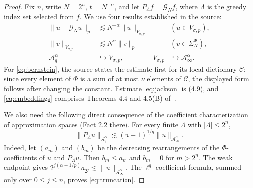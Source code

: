 \documentclass[10pt]{article}
\newcommand{\A}{\mathcal A}
\newcommand{\G}{\mathscr G}
\newcommand{\V}{V_{\sigma,p}}
\newcommand{\norm}[1]{\lVert #1\rVert}
\begin{document}
\begin{proof}
Fix $n$, write $N=2^n$, $t=N^{-\alpha}$, and let
$P_\Lambda f=\G_Nf$, where $\Lambda$ is the greedy index set selected from
$f$.  We use four results established in the source:
\begin{align}
 \norm{u-\G_Nu}_p&\lesssim N^{-\alpha}\norm u_{\V}
       &&(u\in\V),                                      \label{eq:jackson}\tag{J}\\
 \norm v_{\V}&\lesssim N^\alpha\norm v_p
       &&(v\in\Sigma_N^\Phi),                           \label{eq:bernstein}\tag{B}\\
 \A_q^\alpha&\hookrightarrow\V,
       &\V&\hookrightarrow\A_\infty^\alpha.            \label{eq:embeddings}\tag{E}
\end{align}
For \eqref{eq:bernstein}, the source states the estimate first for its local
dictionary $\mathscr C$; since every element of $\Phi$ is a sum of at most
$\nu$ elements of $\mathscr C$, the displayed form follows after changing
the constant.  Estimate \eqref{eq:jackson} is (4.9), and
\eqref{eq:embeddings} comprises Theorems 4.4 and 4.5(B) of~\cite{GKP}.

We also need the following direct consequence of the coefficient
characterization of approximation spaces (Fact 2.2 there).  For every finite
$\Lambda$ with $|\Lambda|\le2^n$,
\begin{equation}\label{eq:truncation}
 \norm{P_\Lambda u}_{\A_q^\alpha}
 \lesssim (n+1)^{1/q}\norm u_{\A_\infty^\alpha}.
\end{equation}
Indeed, let $(a_m)$ and $(b_m)$ be the decreasing rearrangements of the
$\Phi$-coefficients of $u$ and $P_\Lambda u$.  Then $b_m\le a_m$ and
$b_m=0$ for $m>2^n$.  The weak endpoint gives
$2^{j(\alpha+1/p)}a_{2^j}\lesssim\norm u_{\A_\infty^\alpha}$.
The $\ell^q$ coefficient formula, summed only over $0\le j\le n$, proves
\eqref{eq:truncation}.


\end{proof}
\end{document}
